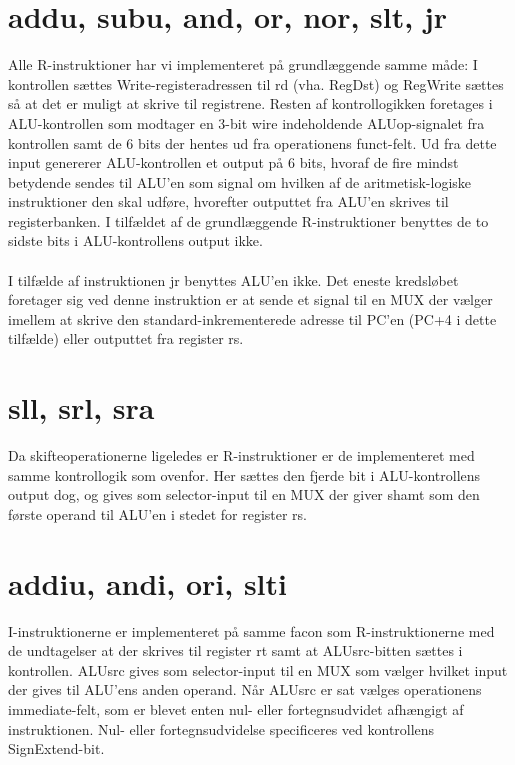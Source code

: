 \documentclass[10pt,a4paper,danish]{article}
\begin{document}
\section{addu, subu, and, or, nor, slt, jr}
Alle R-instruktioner har vi implementeret på grundlæggende samme måde: I kontrollen sættes Write-registeradressen til rd (vha. RegDst) og RegWrite sættes så at det er muligt at skrive til registrene. Resten af kontrollogikken foretages i ALU-kontrollen som modtager en 3-bit wire indeholdende ALUop-signalet fra kontrollen samt de 6 bits der hentes ud fra operationens funct-felt. Ud fra dette input genererer ALU-kontrollen et output på 6 bits, hvoraf de fire mindst betydende sendes til ALU'en som signal om hvilken af de aritmetisk-logiske instruktioner den skal udføre, hvorefter outputtet fra ALU'en skrives til registerbanken. I tilfældet af de grundlæggende R-instruktioner benyttes de to sidste bits i ALU-kontrollens output ikke.

\paragraph{}
I tilfælde af instruktionen jr benyttes ALU'en ikke. Det eneste kredsløbet foretager sig ved denne instruktion er at sende et signal til en MUX der vælger imellem at skrive den standard-inkrementerede adresse til PC'en (PC+4 i dette tilfælde) eller outputtet fra register rs. 

\section{sll, srl, sra}
Da skifteoperationerne ligeledes er R-instruktioner er de implementeret med samme kontrollogik som ovenfor. Her sættes den fjerde bit i ALU-kontrollens output dog, og gives som selector-input til en MUX der giver shamt som den første operand til ALU'en i stedet for register rs. 

\section{addiu, andi, ori, slti} 
I-instruktionerne er implementeret på samme facon som R-instruktionerne med de undtagelser at der skrives til register rt samt at ALUsrc-bitten sættes i kontrollen. ALUsrc gives som selector-input til en MUX som vælger hvilket input der gives til ALU'ens anden operand. Når ALUsrc er sat vælges operationens immediate-felt, som er blevet enten nul- eller fortegnsudvidet afhængigt af instruktionen. Nul- eller fortegnsudvidelse specificeres ved kontrollens SignExtend-bit. 
\end{document}
